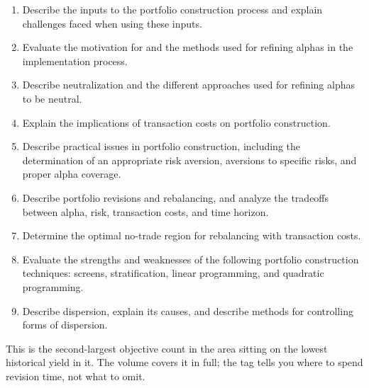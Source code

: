 

\begin{imkeybox}[title={The nine objectives in this reading}]
\begin{enumerate}[label=\textbf{\alph*.}]
\item Describe the inputs to the portfolio construction process and explain challenges faced when using these inputs.
\item Evaluate the motivation for and the methods used for refining alphas in the implementation process.
\item Describe neutralization and the different approaches used for refining alphas to be neutral.
\item Explain the implications of transaction costs on portfolio construction.
\item Describe practical issues in portfolio construction, including the determination of an appropriate risk aversion, aversions to specific risks, and proper alpha coverage.
\item Describe portfolio revisions and rebalancing, and analyze the tradeoffs between alpha, risk, transaction costs, and time horizon.
\item Determine the optimal no-trade region for rebalancing with transaction costs.
\item Evaluate the strengths and weaknesses of the following portfolio construction techniques: screens, stratification, linear programming, and quadratic programming.
\item Describe dispersion, explain its causes, and describe methods for controlling forms of dispersion.
\end{enumerate}
\end{imkeybox}

\begin{imtrapbox}[breakable=false,title={Nine objectives at SRC 1}]
This is the second-largest objective count in the area sitting on the lowest
historical yield in it. The volume covers it in full; the tag tells you where to
spend revision time, not what to omit.
\end{imtrapbox}



